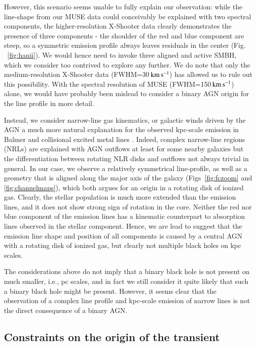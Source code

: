 \documentclass[traditabstract]{aa}
\newcommand{\kms}{$\rm{km\,s^{-1}}$}
\begin{document}
However, this scenario seems unable to fully explain our observation: while the line-shape from our MUSE data could conceivably be explained with two spectral components, the higher-resolution X-Shooter data clearly demonstrates the presence of three components - the shoulder of the red and blue component are steep, so a symmetric emission profile always leaves residuals in the center (Fig. ~\ref{fig:hanii}). We would hence need to invoke three aligned and active SMBH, which we consider too contrived to explore any further. We do note that only the medium-resolution X-Shooter data (FWHM=30\,\kms) has allowed us to rule out this possibility. With the spectral resolution of MUSE (FWHM=150\,\kms) alone, we would have probably been mislead to consider a binary AGN origin for the line profile in more detail. 

Instead, we consider narrow-line gas kinematics, or galactic winds driven by the AGN a much more natural explanation for the observed kpc-scale emission in Balmer and collisional excited metal lines \citep[e.g.,][]{2011ApJ...735...48S}. Indeed, complex narrow-line regions (NRLs) are explained with AGN outflows at least for some nearby galaxies \citep[e.g.,][]{2011ApJ...727...71F} but the differentiation between rotating NLR disks and outflows not always trivial \citep{2011ApJ...735...48S, 2015ApJ...813..103M} in general. In our case, we observe a relatively symmetrical line-profile, as well as a geometry that is aligned along the major axis of the galaxy (Figs~\ref{fig:fczoom} and \ref{fig:channelmaps}), which both argues for an origin in a rotating disk of ionized gas. Clearly, the stellar population is much more extended than the emission lines, and it does not show strong sign of rotation in the core. Neither the red nor blue component of the emission lines has a kinematic counterpart to absorption lines observed in the stellar component. Hence, we are lead to suggest that the emission line shape and position of all components is caused by a central AGN with a rotating disk of ionized gas, but clearly not multiple black holes on kpc scales.

The considerations above do not imply that a binary black hole is not present on much smaller, i.e., pc scales, and in fact we still consider it quite likely that such a binary black hole might be present. However, it seems clear that the observation of a complex line profile and kpc-scale emission of narrow lines is not the direct consequence of a binary AGN.

\subsection{Constraints on the origin of the transient}
\end{document}
